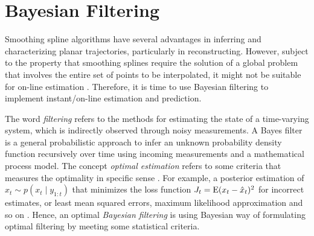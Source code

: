 



%





\section{Bayesian Filtering}

Smoothing spline algorithms have several advantages in inferring and characterizing planar trajectories, particularly in reconstructing. However, subject to the property that smoothing splines require the solution of a global problem that involves the entire set of points to be interpolated, it might not be suitable for on-line estimation \cite{biagiotti2013online}. Therefore, it is time to use Bayesian filtering to implement instant/on-line estimation and prediction. 

The word \textit{filtering} refers to the methods for estimating the state of a time-varying system, which is indirectly observed through noisy measurements. A Bayes filter is a general probabilistic approach to infer an unknown probability density function recursively over time using incoming measurements and a mathematical process model. The concept \textit{optimal estimation} refers to some criteria that measures the optimality in specific sense \cite{anderson1979optimal}. For example, a posterior estimation of $\hat{x}_t\sim p(x_t\mid y_{1:t})$ that minimizes the loss function $J_t=\mathrm{E} (x_t-\hat{x}_t)^2$ for incorrect estimates, or least mean squared errors, maximum likelihood approximation and so on \cite{chen2003bayesian} \cite{sarkka2013bayesian}. Hence, an optimal \textit{Bayesian filtering} is using Bayesian way of formulating optimal filtering by meeting some statistical criteria. 

